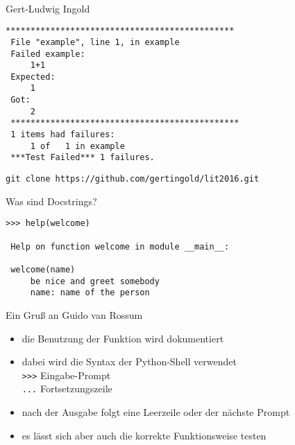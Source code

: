 \documentclass[t, utf8x, 10pt]{beamer}
\begin{document}
\begin{frame}[fragile]
 \vspace{1truecm}
 \begin{center}
  \\[0.3truecm]
  {\large Gert-Ludwig Ingold}

  \vspace{0.5truecm}
  \begin{minipage}{0.5\textwidth}
   \begin{tiny}
    \begin{lstlisting}[backgroundcolor=\color{black!10}
                       ,language={}]
 **********************************************
 File "example", line 1, in example
 Failed example:
     1+1
 Expected:
     1
 Got:
     2
 **********************************************
 1 items had failures:
     1 of   1 in example
 ***Test Failed*** 1 failures.
    \end{lstlisting}
   \end{tiny}
  \end{minipage}

  \vspace{1truecm}
  \texttt{\normalsize git clone https://github.com/gertingold/lit2016.git}
 \end{center}
\end{frame}


\begin{frame}[fragile]{Was sind Docstrings?}
 

 \hrulefill

 \begin{lstlisting}[language={}]
 >>> help(welcome)

 Help on function welcome in module __main__:

 welcome(name)
     be nice and greet somebody
     name: name of the person
 \end{lstlisting}
\end{frame}


\begin{frame}[fragile]{Ein Gruß an Guido van Rossum}
 

 \hrulefill
 \begin{itemize}
  \item die Benutzung der Funktion wird dokumentiert
  \item dabei wird die Syntax der Python-Shell verwendet\\
	\texttt{{>}{>}{>}} \quad Eingabe-Prompt\\
	\texttt{...} \quad Fortsetzungszeile
  \item nach der Ausgabe folgt eine Leerzeile oder der nächste Prompt
  \item \alert{es lässt sich aber auch die korrekte Funktionsweise testen}
 \end{itemize}
\end{frame}
\end{document}
